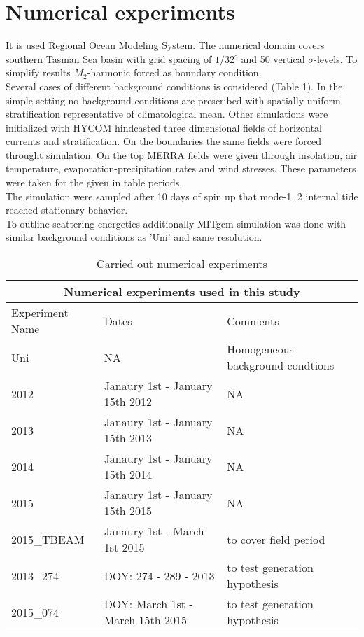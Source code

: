 \section{Numerical experiments}
It is used Regional Ocean Modeling System. The numerical domain covers southern Tasman Sea basin with grid spacing of $1/32^{\circ}$ and 50 vertical $\sigma$-levels. To simplify results $M_2$-harmonic forced as boundary condition.\\
Several cases of different background conditions is considered (Table 1). In the simple setting no background conditions are prescribed with spatially uniform stratification  representative of climatological mean. Other simulations were initialized with HYCOM hindcasted three dimensional fields of horizontal currents and stratification. On the boundaries the same fields were forced throught simulation. On the top MERRA fields were given through insolation, air temperature, evaporation-precipitation rates and wind stresses. These parameters were taken for the given in table periods.\\
The simulation were sampled after 10 days of spin up that mode-1, 2 internal tide reached stationary behavior.\\
To outline scattering energetics additionally MITgcm simulation was done with similar background conditions as 'Uni' and same resolution.\\
\begin{table}
 \caption{Carried out numerical experiments}
 \begin{tabular}{ |p{3cm}||p{5cm}|p{5cm}|  }
 \hline
 \multicolumn{3}{|c|}{Numerical experiments used in this study} \\
 \hline
Experiment Name & Dates & Comments \\
 \hline
Uni & NA & Homogeneous background condtions \\
2012 &   Janaury 1st - January 15th 2012 & NA \\
2013 &   Janaury 1st - January 15th 2013 & NA \\
2014 &   Janaury 1st - January 15th 2014 & NA \\
2015 &   Janaury 1st - January 15th 2015 & NA \\
2015\_TBEAM &   Janaury 1st - March 1st 2015 & to cover field period \\
2013\_274 &   DOY: 274 - 289 - 2013 & to test generation hypothesis \\
2015\_074 &   DOY: March 1st - March 15th 2015 & to test generation hypothesis \\
 \hline
\end{tabular}
\end{table}

